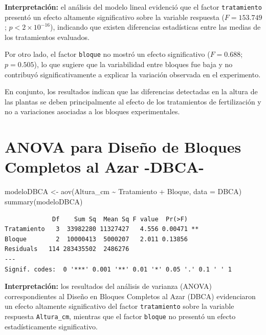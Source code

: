 \documentclass[
  spanish,
  letterpaper,
  DIV=11,
  numbers=noendperiod]{scrreprt}
\newenvironment{Shaded}{\begin{snugshade}}{\end{snugshade}}
\newcommand{\AttributeTok}[1]{\textcolor[rgb]{0.40,0.45,0.13}{#1}}
\newcommand{\FunctionTok}[1]{\textcolor[rgb]{0.28,0.35,0.67}{#1}}
\newcommand{\NormalTok}[1]{\textcolor[rgb]{0.00,0.23,0.31}{#1}}
\newcommand{\OtherTok}[1]{\textcolor[rgb]{0.00,0.23,0.31}{#1}}
\newcommand{\SpecialCharTok}[1]{\textcolor[rgb]{0.37,0.37,0.37}{#1}}
\begin{document}
\textbf{Interpretación:} el análisis del modelo lineal evidenció que el
factor \texttt{tratamiento} presentó un efecto altamente significativo
sobre la variable respuesta (\(F = 153.749\);
\(p < 2 \times 10^{-16}\)), indicando que existen diferencias
estadísticas entre las medias de los tratamientos evaluados.

Por otro lado, el factor \texttt{bloque} no mostró un efecto
significativo (\(F = 0.688\); \(p = 0.505\)), lo que sugiere que la
variabilidad entre bloques fue baja y no contribuyó significativamente a
explicar la variación observada en el experimento.

En conjunto, los resultados indican que las diferencias detectadas en la
altura de las plantas se deben principalmente al efecto de los
tratamientos de fertilización y no a variaciones asociadas a los bloques
experimentales.

\section{ANOVA para Diseño de Bloques Completos al Azar
-DBCA-}\label{anova-para-diseuxf1o-de-bloques-completos-al-azar--dbca-}

\begin{Shaded}
\begin{Highlighting}[]
\NormalTok{modeloDBCA }\OtherTok{\textless{}{-}} \FunctionTok{aov}\NormalTok{(Altura\_cm }\SpecialCharTok{\textasciitilde{}}\NormalTok{ Tratamiento }\SpecialCharTok{+}\NormalTok{ Bloque, }\AttributeTok{data =}\NormalTok{ DBCA)}
\FunctionTok{summary}\NormalTok{(modeloDBCA)}
\end{Highlighting}
\end{Shaded}

\begin{verbatim}
             Df    Sum Sq  Mean Sq F value  Pr(>F)   
Tratamiento   3  33982280 11327427   4.556 0.00471 **
Bloque        2  10000413  5000207   2.011 0.13856   
Residuals   114 283435502  2486276                   
---
Signif. codes:  0 '***' 0.001 '**' 0.01 '*' 0.05 '.' 0.1 ' ' 1
\end{verbatim}

\textbf{Interpretación:} los resultados del análisis de varianza (ANOVA)
correspondientes al Diseño en Bloques Completos al Azar (DBCA)
evidenciaron un efecto altamente significativo del factor
\texttt{tratamiento} sobre la variable respuesta \texttt{Altura\_cm},
mientras que el factor \texttt{bloque} no presentó un efecto
estadísticamente significativo.
\end{document}
